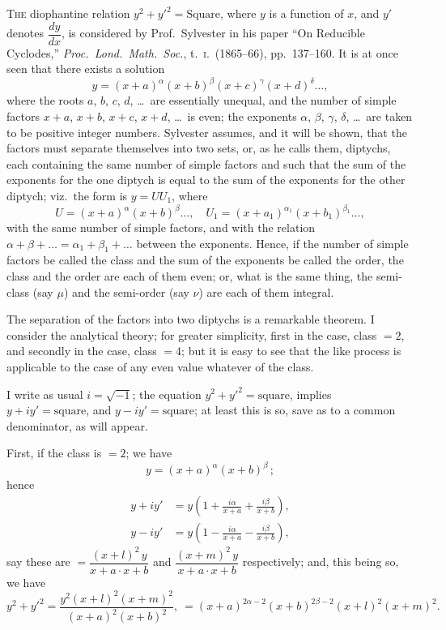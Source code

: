 \documentclass[11pt,a4paper]{book}
\begin{document}
\textsc{The} diophantine relation $y^2 + y'^2 = \text{Square}$, where $y$ is a function of $x$, and $y'$ denotes $\dfrac{dy}{dx}$, is considered by Prof.~Sylvester in his paper ``On Reducible Cyclodes,'' \textit{Proc.\ Lond.\ Math.\ Soc.}, t.\ \textsc{i}.\ (1865--66), pp.\ 137--160. It is at once seen that there exists a solution
\[ y = (x+a)^{\alpha} (x+b)^{\beta} (x+c)^{\gamma} (x+d)^{\delta} \ldots, \]
where the roots $a$, $b$, $c$, $d$, \ldots\ are essentially unequal, and the number of simple factors $x+a$, $x+b$, $x+c$, $x+d$, \ldots\ is even; the exponents $\alpha$, $\beta$, $\gamma$, $\delta$, \ldots\ are taken to be positive integer numbers. Sylvester assumes, and it will be shown, that the factors must separate themselves into two sets, or, as he calls them, diptychs, each containing the same number of simple factors and such that the sum of the exponents for the one diptych is equal to the sum of the exponents for the other diptych; viz.\ the form is $y = UU_1$, where
\[ U = (x+a)^{\alpha} (x+b)^{\beta} \ldots,\quad U_1 = (x+a_1)^{\alpha_1} (x+b_1)^{\beta_1} \ldots, \]
with the same number of simple factors, and with the relation $\alpha + \beta + \ldots = \alpha_1 + \beta_1 + \ldots$ between the exponents. Hence, if the number of simple factors be called the class and the sum of the exponents be called the order, the class and the order are each of them even; or, what is the same thing, the semi-class (say $\mu$) and the semi-order (say $\nu$) are each of them integral.

The separation of the factors into two diptychs is a remarkable theorem. I consider the analytical theory; for greater simplicity, first in the case, class $= 2$, and secondly in the case, class $= 4$; but it is easy to see that the like process is applicable to the case of any even value whatever of the class.

I write as usual $i = \sqrt{-1}$; the equation $y^2 + y'^2 = \text{square}$, implies $y + iy' = \text{square}$, and $y - iy' = \text{square}$; at least this is so, save as to a common denominator, as will appear.

First, if the class is $= 2$; we have
\[ y = (x+a)^{\alpha} (x+b)^{\beta}\,; \]
hence
\begin{align*}
y + iy' &= y \left(1 + \frac{i\alpha}{x+a} + \frac{i\beta}{x+b}\right), \\
y - iy' &= y \left(1 - \frac{i\alpha}{x+a} - \frac{i\beta}{x+b}\right),
\end{align*}
say these are $= \dfrac{(x+l)^2\, y}{x+a \cdot x+b}$ and $\dfrac{(x+m)^2\, y}{x+a \cdot x+b}$ respectively; and, this being so, we have
\[ y^2 + y'^2 = \frac{y^2 (x+l)^2 (x+m)^2}{(x+a)^2 (x+b)^2},\ = (x+a)^{2\alpha-2} (x+b)^{2\beta-2} (x+l)^2 (x+m)^2. \]
\end{document}
